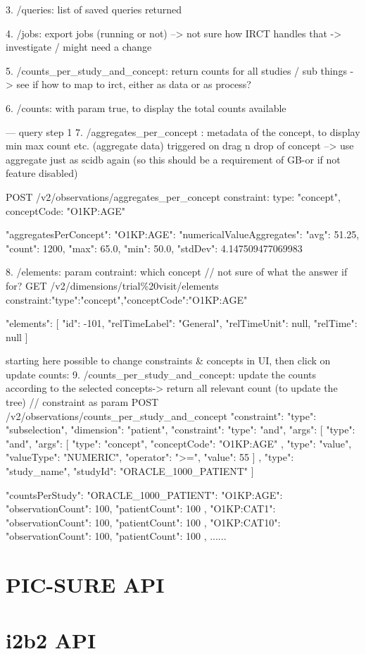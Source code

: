 3. /queries: list of saved queries returned

4. /jobs: export jobs (running or not) --> not sure how IRCT handles that -> investigate / might need a change

5. /counts\_per\_study\_and\_concept: return counts for all studies / sub things -> see if how to map to irct, either as data or as process?

6. /counts: with param true, to display the total counts available

--- query step 1
7. /aggregates\_per\_concept : metadata of the concept, to display min max count etc. (aggregate data)
triggered on drag n drop of concept
--> use aggregate just as scidb again (so this should be a requirement of GB-or if not feature disabled)

POST /v2/observations/aggregates\_per\_concept
{constraint: {type: "concept", conceptCode: "O1KP:AGE"}}

{
  "aggregatesPerConcept": {
    "O1KP:AGE": {
      "numericalValueAggregates": {
        "avg": 51.25,
        "count": 1200,
        "max": 65.0,
        "min": 50.0,
        "stdDev": 4.147509477069983
      }
    }
  }
}


8. /elements: param contraint: which concept // not sure of what the answer if for?
GET /v2/dimensions/trial\%20visit/elements
constraint:{"type":"concept","conceptCode":"O1KP:AGE"}

{
  "elements": 
  [
    {
      "id": -101,
      "relTimeLabel": "General",
      "relTimeUnit": null,
      "relTime": null
    }
  ]
}


starting here possible to change constraints & concepts in UI, then click on update counts:
9. /counts\_per\_study\_and\_concept: update the counts according to the selected concepts-> return all relevant count (to update the tree) // constraint as param
POST /v2/observations/counts\_per\_study\_and\_concept
{
  "constraint": {
    "type": "subselection",
    "dimension": "patient",
    "constraint": {
      "type": "and",
      "args": [
        {
          "type": "and",
          "args": [
            {
              "type": "concept",
              "conceptCode": "O1KP:AGE"
            },
            {
              "type": "value",
              "valueType": "NUMERIC",
              "operator": ">=",
              "value": 55
            }
          ]
        },
        {
          "type": "study_name",
          "studyId": "ORACLE_1000_PATIENT"
        }
      ]
    }
  }
}

{
  "countsPerStudy": {
    "ORACLE_1000_PATIENT": {
      "O1KP:AGE": {
        "observationCount": 100,
        "patientCount": 100
      },
      "O1KP:CAT1": {
        "observationCount": 100,
        "patientCount": 100
      },
      "O1KP:CAT10": {
        "observationCount": 100,
        "patientCount": 100
      },
      ......
    }
  }
}



\section{PIC-SURE API}

\section{i2b2 API}
